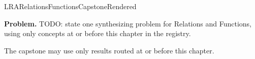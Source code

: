 \ifcsname LRARelationsFunctionsCapstoneRendered\endcsname
\else
\expandafter\gdef\csname LRARelationsFunctionsCapstoneRendered\endcsname{}

\newpage
{}
\label{cap:relations-functions}

\begin{tcolorbox}[
  colback=gray!6,
  colframe=gray!40,
  arc=2pt,
  left=8pt, right=8pt, top=6pt, bottom=6pt,
  title={\small\textbf{Capstone Problem}},
  fonttitle=\small\bfseries
]
\textbf{Problem.}
TODO: state one synthesizing problem for Relations and Functions, using only concepts at or
before this chapter in the registry.
\end{tcolorbox}

\begin{remark*}
The capstone may use only results routed at or before this chapter.
\end{remark*}

\clearpage
\fi
